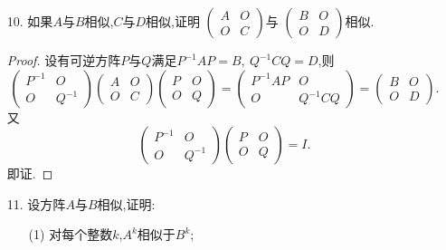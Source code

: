\documentclass{article}
\begin{document}
\begin{enumerate}
\begin{enumerate}
\[        \]
    \end{enumerate}
    \item [10.]如果$A$与$B$相似,$C$与$D$相似,证明
    $\begin{pmatrix}
        A & O\\
        O & C
    \end{pmatrix}$与
    $\begin{pmatrix}
        B & O\\
        O & D
    \end{pmatrix}$相似.
    \begin{proof}
        设有可逆方阵$P$与$Q$满足$P^{-1} A P=B,\ Q^{-1} C Q=D$,则
        \[
            \begin{pmatrix}
                P^{-1} & O\\
                O & Q^{-1} 
            \end{pmatrix}
            \begin{pmatrix}
                A & O\\
                O & C
            \end{pmatrix}
            \begin{pmatrix}
                P & O\\
                O & Q
            \end{pmatrix}
            =\begin{pmatrix}
                P^{-1} A P & O\\
                O & Q^{-1} C Q
            \end{pmatrix}
            =\begin{pmatrix}
                B & O\\
                O & D
            \end{pmatrix}.
        \]
        又
        \[
            \begin{pmatrix}
                P^{-1} & O\\
                O & Q^{-1} 
            \end{pmatrix}
            \begin{pmatrix}
                P & O\\
                O & Q
            \end{pmatrix}
            =I.
        \]
        即证.
    \end{proof}
    \item [11.]设方阵$A$与$B$相似,证明:
    \begin{enumerate}
        \item [(1)]对每个整数$k$,$A^k$相似于$B^k$;

\end{enumerate}
\end{enumerate}
\end{document}
